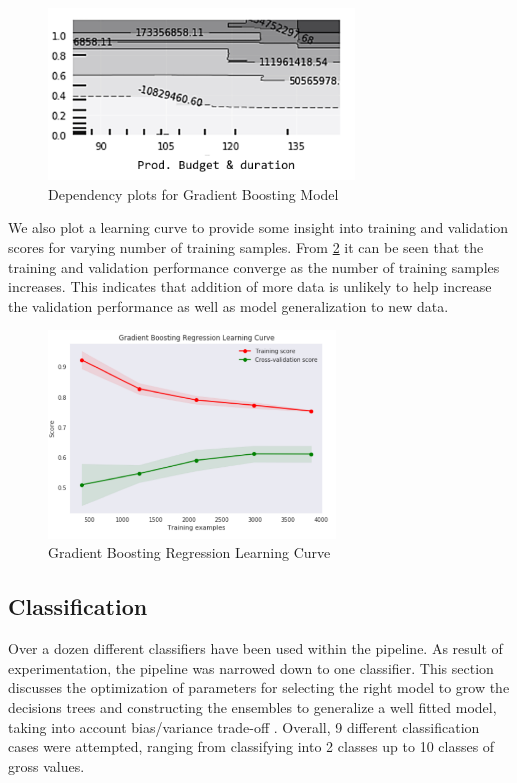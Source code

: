 \begin{figure}[h]
\centering
\includegraphics[width=3.2in]{figures/gb_dependency_4}
\caption{Dependency plots for Gradient Boosting Model} 
\label{fig:gradient_boost_dependency}
\end{figure}

We also plot a learning curve to provide some insight into training and validation scores for varying number of training samples. From \figurename{} \ref{fig:gradient_boost} it can be seen that the training and validation performance converge as the number of training samples increases. This indicates that addition of  more data is unlikely to help increase the validation performance as well as model generalization to new data.

\begin{figure}[h]
\centering
\includegraphics[width=3.0in]{figures/gradient_boost}
\caption{Gradient Boosting Regression Learning Curve} 
\label{fig:gradient_boost}
\end{figure}

\subsection{Classification}

Over a dozen different classifiers have been used within the pipeline. As result of experimentation, the pipeline was narrowed down to one classifier. This section discusses the optimization of parameters for selecting the right model to grow the decisions trees and constructing the ensembles to generalize a well fitted model, taking into account bias/variance trade-off \cite{biasvariance}. Overall, 9 different classification cases were attempted, ranging from classifying into 2 classes up to 10 classes of gross values. 

